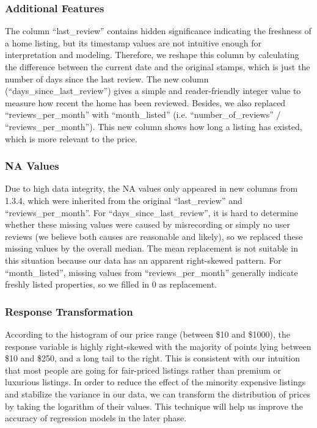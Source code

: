 \documentclass[twocolumn]{article}
\begin{document}
\subsubsection{Additional Features}
The column “last\_review” contains hidden significance indicating the freshness of a home listing, but its timestamp values are not intuitive enough for interpretation and modeling. Therefore, we reshape this column by calculating the difference between the current date and the original stamps, which is just the number of days since the last review. The new column (“days\_since\_last\_review”) gives a simple and reader-friendly integer value to measure how recent the home has been reviewed. Besides, we also replaced “reviews\_per\_month” with “month\_listed” (i.e. “number\_of\_reviews” / “reviews\_per\_month”). This new column shows how long a listing has existed, which is more relevant to the price.

\subsubsection{NA Values}
Due to high data integrity, the NA values only appeared in new columns from 1.3.4, which were inherited from the original “last\_review” and “reviews\_per\_month”. For “days\_since\_last\_review”, it is hard to determine whether these missing values were caused by misrecording or simply no user reviews (we believe both causes are reasonable and likely), so we replaced these missing values by the overall median. The mean replacement is not suitable in this situation because our data has an apparent right-skewed pattern. For “month\_listed”, missing values from “reviews\_per\_month” generally indicate freshly listed properties, so we filled in 0 as replacement.


\subsubsection{Response Transformation}
According to the histogram of our price range (between \$10 and \$1000), the response variable is highly right-skewed with the majority of points lying between \$10 and \$250, and a long tail to the right. This is consistent with our intuition that most people are going for fair-priced listings rather than premium or luxurious listings. In order to reduce the effect of the minority expensive listings and stabilize the variance in our data,  we can transform the distribution of prices by taking the logarithm of their values. This technique will help us improve the accuracy of regression models in the later phase.
\end{document}
